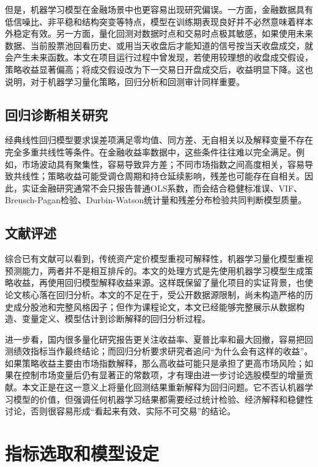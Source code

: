 \documentclass[UTF8,a4paper,12pt]{ctexart}
\begin{document}
但是，机器学习模型在金融场景中也更容易出现研究偏误。一方面，金融数据具有低信噪比、非平稳和结构突变等特点，模型在训练期表现良好并不必然意味着样本外稳定有效。另一方面，量化回测对数据时点和交易时点极其敏感，如果使用未来数据、当前股票池回看历史、或用当天收盘后才能知道的信号按当天收盘成交，就会产生未来函数。本文在项目运行过程中曾发现，若使用较理想的收盘成交假设，策略收益显著偏高；将成交假设改为下一交易日开盘成交后，收益明显下降。这也说明，对于机器学习量化策略，回归分析和回测审计同样重要。

\subsection{回归诊断相关研究}
经典线性回归模型要求误差项满足零均值、同方差、无自相关以及解释变量不存在完全多重共线性等条件。在金融收益率数据中，这些条件往往难以完全满足。例如，市场波动具有聚集性，容易导致异方差；不同市场指数之间高度相关，容易导致共线性；策略收益可能受调仓周期和持仓延续影响，残差也可能存在自相关。因此，实证金融研究通常不会只报告普通OLS系数，而会结合稳健标准误、VIF、Breusch-Pagan检验、Durbin-Watson统计量和残差分布检验共同判断模型质量\cite{white1980,breusch1979,durbin1951,jarque1980}。

\subsection{文献评述}
综合已有文献可以看到，传统资产定价模型重视可解释性，机器学习量化模型重视预测能力，两者并不是相互排斥的。本文的处理方式是先使用机器学习模型生成策略收益，再使用回归模型解释收益来源。这样既保留了量化项目的实证背景，也使论文核心落在回归分析。本文的不足在于，受公开数据源限制，尚未构造严格的历史成分股池和完整风格因子；但作为课程论文，本文已经能够完整展示从数据构造、变量定义、模型估计到诊断解释的回归分析过程。

进一步看，国内很多量化研究报告更关注收益率、夏普比率和最大回撤，容易把回测绩效指标当作最终结论；而回归分析要求研究者追问“为什么会有这样的收益”。如果策略收益主要由市场指数解释，那么高收益可能只是承担了更高市场风险；如果在控制市场变量后仍有显著正的常数项，才有理由进一步讨论选股模型的增量贡献。本文正是在这一意义上将量化回测结果重新解释为回归问题。它不否认机器学习模型的价值，但强调任何机器学习结果都需要经过统计检验、经济解释和稳健性讨论，否则很容易形成“看起来有效、实际不可交易”的结论。

\section{指标选取和模型设定}
\end{document}
